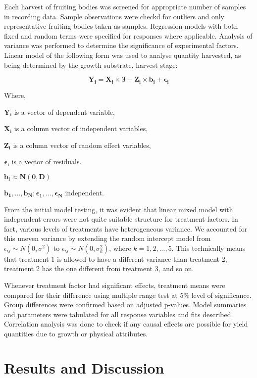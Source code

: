 \documentclass[]{article}
\begin{document}
Each harvest of fruiting bodies was screened for appropriate number of samples in recording data. Sample observations were checkd for outliers and only representative fruiting bodies taken as samples. Regression models with both fixed and random terms were specified for responses where applicable. Analysis of variance was performed to determine the significance of experimental factors. Linear model of the following form was used to analyse quantity harvested, as being determined by the growth substrate, harvest stage:

\[
\boldsymbol{Y_{i}}= \boldsymbol{X_i} \times \boldsymbol{\beta} + \boldsymbol{Z_i} \times \boldsymbol{b_i} + \boldsymbol{\epsilon_i}
\]

Where,

\(\boldsymbol{Y_{i}}\) is a vector of dependent variable,

\(\boldsymbol{X_i}\) is a column vector of independent variables,

\(\boldsymbol{Z_i}\) is a column vector of random effect variables,

\(\boldsymbol{\epsilon_i}\) is a vector of residuals.

\(\boldsymbol{b_i} \approx \boldsymbol{N(0, D)}\)

\(\boldsymbol{b_1, ..., b_N};\boldsymbol{\epsilon_1, ..., \epsilon_N}\) independent.

From the initial model testing, it was evident that linear mixed model with independent errors were not quite suitable structure for treatment factors. In fact, various levels of treatments have heterogeneous variance. We accounted for this uneven variance by extending the random intercept model from \(\epsilon_{ij} \sim N(0, \sigma^2)\) to \(\epsilon_{ij} \sim N(0, \sigma_k^2)\), where \(k = 1, 2, ..., 5\). This technically means that treatment 1 is allowed to have a different variance than treatment 2, treatment 2 has the one different from treatment 3, and so on.

Whenever treatment factor had significant effects, treatment means were compared for their difference using multiple range test at 5\% level of significance. Group differences were confirmed based on adjusted p-values. Model summaries and parameters were tabulated for all response variables and fits described. Correlation analysis was done to check if any causal effects are possible for yield quantities due to growth or physical attributes.

\hypertarget{results-and-discussion}{%
\section{Results and Discussion}\label{results-and-discussion}}
\end{document}
